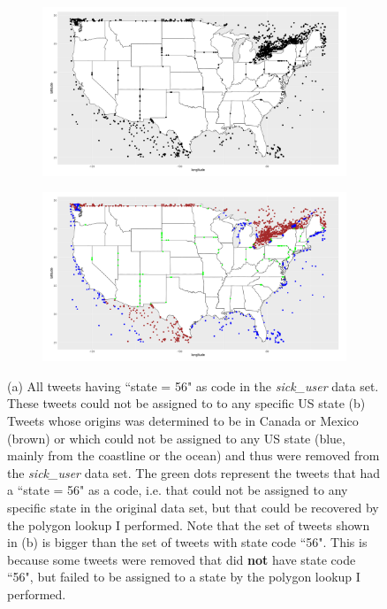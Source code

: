 \documentclass[11pt, a4paper,twoside]{report}\usepackage[]{graphicx}\usepackage[]{color}
\begin{document}
\begin{figure}[h]
  \centering
    \begin{subfigure}[t]{0.9\textwidth}
    \includegraphics[width=1\linewidth]{state56_sick_raw_df.png}
    \caption{}
    \label{fig:code56}
  \end{subfigure}
  \begin{subfigure}[t]{0.9\textwidth}
  \includegraphics[width=1\linewidth]{CanexicoAndRemoved_sick_raw_df.png}
  \caption{}
  \label{fig:canexico_and_removed}
  \end{subfigure}
  \caption{(a) All tweets having ``state = 56" as code in the \textit{sick\_user} data set. These tweets could not be assigned to to any specific US state (b) Tweets whose origins was determined to be in Canada or Mexico (brown) or which could not be assigned to any US state (blue, mainly from the coastline or the ocean) and thus were removed from the \textit{sick\_user} data set. The green dots represent the tweets that had a ``state = 56" as  a code, i.e. that could not be assigned to any specific state in the original data set, but that could be recovered by the polygon lookup I performed. Note that the set of tweets shown in (b) is bigger than the set of tweets with state code ``56". This is because some tweets were removed that did \textbf{not} have state code ``56", but failed to be assigned to a state by the polygon lookup I performed.}
  \end{figure}
\end{document}
